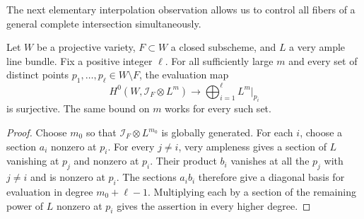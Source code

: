 The next elementary interpolation observation allows us to control all
fibers of a general complete intersection simultaneously.

\begin{lemma}\label{red:interpolation}
Let $W$ be a projective variety, $F\subset W$ a closed subscheme, and
$L$ a very ample line bundle.  Fix a positive integer $\ell$.  For all
sufficiently large $m$ and every set of distinct points
$p_1,\ldots,p_\ell\in W\setminus F$, the evaluation map
\[
 H^0(W,\mathcal I_F\otimes L^m)
 \longrightarrow \bigoplus_{i=1}^{\ell}L^m|_{p_i}
\]
is surjective.  The same bound on $m$ works for every such set.
\end{lemma}

\begin{proof}
Choose $m_0$ so that $\mathcal I_F\otimes L^{m_0}$ is globally
generated.  For each $i$, choose a section $a_i$ nonzero at $p_i$.
For every $j\ne i$, very ampleness gives a section of $L$ vanishing at
$p_j$ and nonzero at $p_i$.  Their product $b_i$ vanishes at all the
$p_j$ with $j\ne i$ and is nonzero at $p_i$.  The sections $a_ib_i$
therefore give a diagonal basis for evaluation in degree
$m_0+\ell-1$.  Multiplying each by a section of the remaining power
of $L$ nonzero at $p_i$ gives the assertion in every higher degree.
\end{proof}

